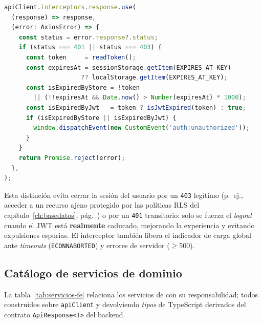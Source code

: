 \clearpage
\begin{lstlisting}[language=JavaScript, caption={Interceptor de respuesta: distinción entre expiración real y error puntual (\texttt{apiClient.ts}).}, label={lst:resp-interceptor}]
apiClient.interceptors.response.use(
  (response) => response,
  (error: AxiosError) => {
    const status = error.response?.status;
    if (status === 401 || status === 403) {
      const token     = readToken();
      const expiresAt = sessionStorage.getItem(EXPIRES_AT_KEY)
                     ?? localStorage.getItem(EXPIRES_AT_KEY);
      const isExpiredByStore = !token
        || (!!expiresAt && Date.now() > Number(expiresAt) * 1000);
      const isExpiredByJwt   = token ? isJwtExpired(token) : true;
      if (isExpiredByStore || isExpiredByJwt) {
        window.dispatchEvent(new CustomEvent('auth:unauthorized'));
      }
    }
    return Promise.reject(error);
  },
);
\end{lstlisting}

\begin{AvisoNota}
Esta distinción evita cerrar la sesión del usuario por un \texttt{403} legítimo (p.~ej.,
acceder a un recurso ajeno protegido por las políticas RLS del capítulo~\ref{ch:basedatos},
pág.~\pageref{ch:basedatos}) o por un \texttt{401} transitorio: solo se fuerza el
\textit{logout} cuando el JWT está \textbf{realmente} caducado, mejorando la experiencia y
evitando expulsiones espurias. El interceptor también libera el indicador de carga global
ante \textit{timeouts} (\texttt{ECONNABORTED}) y errores de servidor ($\ge$500).
\end{AvisoNota}

\subsection{Catálogo de servicios de dominio}
\label{subsec:servicios_catalogo}

La tabla~\ref{tab:servicios-fe} relaciona los servicios de  con
su responsabilidad; todos construidos sobre \texttt{apiClient} y devolviendo \textit{tipos}
de TypeScript derivados del contrato \texttt{ApiResponse<T>} del backend.

